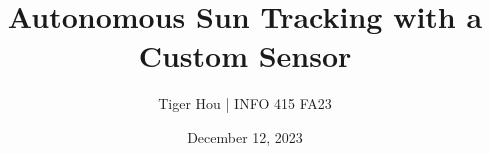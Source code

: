 

\setlength{\headheight}{16pt}
\setlength{\footskip}{36pt}

\title{\vspace{-0.6in}Autonomous Sun Tracking with a Custom Sensor\vspace{-0.1in}}
\author{Tiger Hou  |  INFO 415 FA23}
\date{December 12, 2023\vspace{-0.2in}}

\fancyhf{}



\maketitle
\thispagestyle{firstpagestyle}



% 
% 

